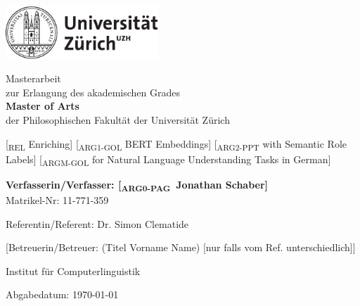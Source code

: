 \begin{titlepage}
\includegraphics[height=20mm]{images/uzh_logo_d_pos}\\

\begin{center}

{\sffamily
Masterarbeit \\
zur Erlangung des akademischen Grades \\
\textbf{Master of Arts} \\
der Philosophischen Fakultät der Universität Zürich \\

\vspace{2cm}

{\Large [\textsubscript{REL} Enriching] [\textsubscript{ARG1-GOL} BERT Embeddings] [\textsubscript{ARG2-PPT} with Semantic Role Labels] [\textsubscript{ARGM-GOL} for Natural Language Understanding Tasks in German]}\\

\vspace{4cm}

\textbf{Verfasserin/Verfasser: [\textsubscript{ARG0-PAG} Jonathan Schaber]} \\
	Matrikel-Nr: 11-771-359 \\

\vspace{2cm}

Referentin/Referent: Dr. Simon Clematide

[Betreuerin/Betreuer: (Titel Vorname Name) {\small [nur falls vom Ref. unterschiedlich]}]

Institut f\"ur Computerlinguistik

\vfill Abgabedatum: \today

\vspace{3cm}
}
\end{center}

\end{titlepage}

\newpage

